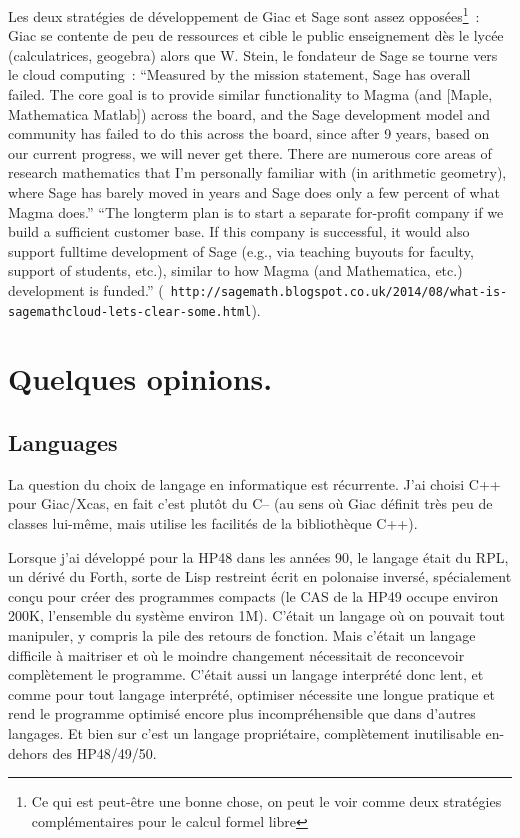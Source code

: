 \documentclass[a4paper,11pt]{article}
\begin{document}
Les deux strat\'egies de d\'eveloppement de Giac et Sage
sont assez oppos\'ees\footnote{Ce qui est peut-\^etre une bonne chose,
on peut le voir comme deux strat\'egies compl\'ementaires pour le
calcul formel libre}~: Giac se contente de peu de ressources et cible le 
public enseignement d\`es le lyc\'ee (calculatrices, geogebra) alors
que W. Stein, le fondateur de Sage se tourne vers le cloud computing~:
``Measured by the mission statement, Sage has overall failed. The core
goal is to provide similar functionality to Magma (and [Maple,
Mathematica Matlab]) across the board, and the Sage development model
and community has failed to do this across the board, since after 9
years, based on our current progress, we will never get there. There
are numerous core areas of research mathematics that I'm personally
familiar with (in arithmetic geometry), where Sage has barely moved in
years and Sage does only a few percent of what Magma does.''
``The longterm plan is to start a separate for-profit company if we
build a sufficient customer base. If this company is successful, it
would also support fulltime development of Sage (e.g., via teaching
buyouts for faculty, support of students, etc.), similar to how Magma
(and Mathematica, etc.) development is funded.'' ({\tt \tiny
  http://sagemath.blogspot.co.uk/2014/08/what-is-sagemathcloud-lets-clear-some.html}).

\section{Quelques opinions.}
\subsection{Languages}
La question du choix de langage en informatique est r\'ecurrente.
J'ai choisi C++ pour Giac/Xcas, en fait c'est plut\^ot du C-- (au
sens o\`u Giac d\'efinit tr\`es peu de classes lui-m\^eme, mais
utilise les facilit\'es de la biblioth\`eque C++).

Lorsque j'ai d\'evelopp\'e pour la HP48 dans les ann\'ees 90, le langage
\'etait du RPL, un d\'eriv\'e du Forth, sorte de Lisp restreint \'ecrit
en polonaise invers\'e, sp\'ecialement con\c{c}u pour cr\'eer
des programmes compacts (le CAS de la HP49 occupe environ
200K, l'ensemble du syst\`eme environ 1M).
C'\'etait un langage o\`u on pouvait
tout manipuler, y compris la pile des retours de fonction.
Mais c'\'etait un langage difficile \`a maitriser et o\`u le
moindre changement n\'ecessitait de reconcevoir compl\`etement
le programme. C'\'etait aussi un langage interpr\'et\'e donc lent,
et comme pour tout langage interpr\'et\'e, optimiser n\'ecessite
une longue pratique et rend le programme optimis\'e encore plus
incompr\'ehensible que dans d'autres langages.
Et bien sur c'est un langage propri\'etaire, compl\`etement
inutilisable en-dehors des HP48/49/50.
\end{document}
